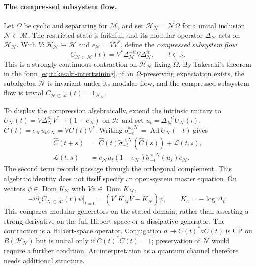 \documentclass[a4paper,11pt]{article}
\theoremstyle{definition}
\newcommand{\nn}{\nonumber}
\newcommand{\mN}{\mathcal{N}}
\newcommand{\mH}{\mathcal{H}}
\newcommand{\mM}{\mathcal{M}}
\begin{document}
\paragraph{The compressed subsystem flow.}
Let $\Omega$ be cyclic and separating for $\mM$, and set
$\mH_{\mN}=\overline{\mN\Omega}$ for a unital inclusion $\mN\subset\mM$.
The restricted state is faithful, and its modular operator $\Delta_{\mN}$ acts on
$\mH_{\mN}$. With $V:\mH_{\mN}\hookrightarrow\mathcal H$ and $e_{\mN}=VV^*$,
define the {\it compressed subsystem flow}
\begin{equation}
 C_{\mN\subset\mM}(t)=V^*\Delta_{\mM}^{-it}V\Delta_{\mN}^{it},
 \qquad t\in\mathbb R.
\end{equation}
This is a strongly continuous contraction on $\mH_{\mN}$ fixing $\Omega$. By Takesaki's theorem in the form \eqref{eq:takesaki-intertwining}, if an $\Omega$-preserving expectation exists, the subalgebra $\mN$ is invariant under its modular flow, and the compressed subsystem flow is trivial
$C_{\mN\subset\mM}(t)=1_{\mH_{\mN}}$.

To display the compression algebraically, extend the intrinsic unitary to
$U_{\mN}(t)=V\Delta_{\mN}^{it}V^*+(1-e_{\mN})$ on $\mathcal H$ and set
$u_t=\Delta_{\mM}^{-it}U_{\mN}(t)$, $\widehat C(t)=e_{\mN}u_te_{\mN}=VC(t)V^*$.
Writing $\widetilde\sigma^{\omega;\mN}_{-t}=\operatorname{Ad}U_{\mN}(-t)$ gives
\begin{align}
 \widehat C(t+s)&=\widehat C(t)\widetilde\sigma^{\omega;\mN}_{-t}(\widehat C(s))
                  +\mathcal L(t,s),\nn\\
 \mathcal L(t,s)&=e_{\mN}u_t(1-e_{\mN})\widetilde\sigma^{\omega;\mN}_{-t}(u_s)e_{\mN}.
\end{align}
The second term records passage through the orthogonal complement. This algebraic
identity does not itself specify an open-system master equation.
On vectors $\psi\in\operatorname{Dom}K_{\mN}$ with $V\psi\in\operatorname{Dom}K_{\mM}$,
\begin{equation}
 -i\left.\partial_t C_{\mN\subset\mM}(t)\psi\right|_{t=0}
 =(V^*K_{\mM}V-K_{\mN})\psi,\qquad K_{\mathcal C}=-\log\Delta_{\mathcal C}.
\end{equation}
This compares modular generators on the stated domain, rather than asserting
a strong derivative on the full Hilbert space or a dissipative generator.
The contraction is a Hilbert-space operator. Conjugation
$a\mapsto C(t)^*aC(t)$ is CP on $B(\mH_{\mN})$ but is unital only if
$C(t)^*C(t)=1$; preservation of $\mN$ would require a further condition.
An interpretation as a quantum channel therefore needs additional structure.
\end{document}
